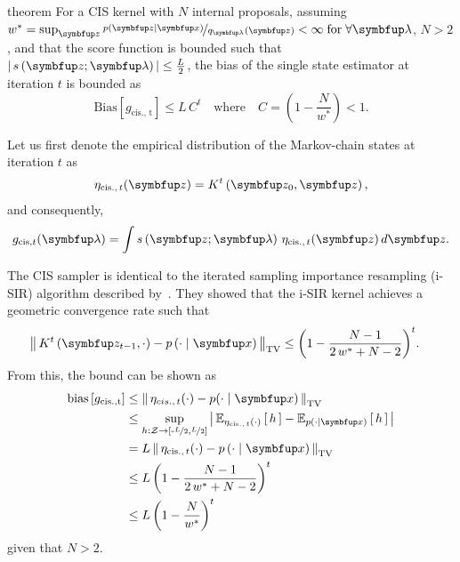 \begin{theoremEnd}{theorem}
  For a CIS kernel with \(N\) internal proposals,
  assuming \(w^* = \sup_{\vz} \nicefrac{p\left(\vz\mid\vx\right)}{q_{\vlambda}\left(\vz\right)} < \infty\; \text{for} \; \forall \vlambda \), \(N > 2\), and that the score function is bounded such that \(\left|\,s\left(\vz; \vlambda\right)\,\right| \leq \frac{L}{2}\), the bias of the single state estimator at iteration \(t\) is bounded as
  {\small
  \[
    \mathrm{Bias}\left[ g_{\mathrm{cis.,\, t}} \right] \leq L \, C^t
    \quad\text{where}\quad C = \left(1 - \frac{N}{w^*}\right) < 1.
  \]
  }
\end{theoremEnd}
%
\begin{proofEnd}
  Let us first denote the empirical distribution of the Markov-chain states at iteration \(t\) as
  \begin{align}
    \eta_{\mathrm{cis.},\, t}(\vz) = K^{t}\left(\vz_0, \vz\right),
  \end{align}
  and consequently,
  \begin{align}
      g_{\mathrm{cis}, t}(\vlambda) = \int s\left(\vz; \vlambda\right) \, \eta_{\mathrm{cis.},\, t}(\vz) \, d\vz.
  \end{align}

  The CIS sampler is identical to the iterated sampling importance resampling (i-SIR) algorithm described by~\citet{andrieu_uniform_2018}.
  They showed that the i-SIR kernel achieves a geometric convergence rate such that
  \begin{align}
    \DTV{K^{t}\left(\vz_{t-1},\cdot\right)}{p\left(\cdot\mid\vx\right)}
    &\leq {\left(1 - \frac{N - 1}{2\,w^* + N - 2}\right)}^t.
  \end{align}
  From this, the bound can be shown as
  \begin{align}
    \mathrm{bias}\left[ g_{\mathrm{cis., t}} \right]
    &\leq \DTV{\eta_{cis.,\, t}(\cdot)}{p(\cdot\mid\vx)} \\
    &\leq \sup_{h : \mathcal{Z} \rightarrow \left[ \text{-}\nicefrac{L}{2}, \nicefrac{L}{2} \right]} \left|\, \Esub{\eta_{\mathrm{cis.},\, t}(\cdot)}{h} - \Esub{p(\cdot\mid\vx)}{h} \,\right| \\
    &= L \, \DTV{ \eta_{\mathrm{cis.},\, t}(\cdot) }{p\left(\cdot\mid\vx\right)}  \\
    &\leq L \, {\left(1 - \frac{N - 1}{2\,w^* + N - 2}\right)}^t \\
    &\leq L \, {\left(1 - \frac{N}{w^*}\right)}^t \\
  \end{align}
  given that \(N > 2\).
\end{proofEnd}

